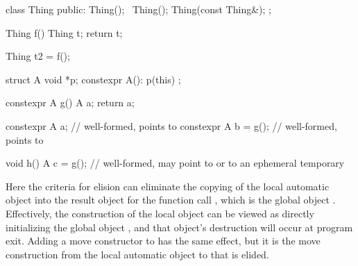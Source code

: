 \pnum
\begin{example}
\begin{codeblock}
class Thing {
public:
  Thing();
  ~Thing();
  Thing(const Thing&);
};

Thing f() {
  Thing t;
  return t;
}

Thing t2 = f();

struct A {
  void *p;
  constexpr A(): p(this) {}
};

constexpr A g() {
  A a;
  return a;
}

constexpr A a;          // well-formed,  points to 
constexpr A b = g();    // well-formed,  points to 

void h() {
  A c = g();            // well-formed,  may point to  or to an ephemeral temporary
}
\end{codeblock}
Here the criteria for elision can
eliminate
the copying of the local automatic object
into the result object for the function call
,
which is the global object
.
Effectively, the construction of the local object
can be viewed as directly initializing the global
object
,
and that object's destruction will occur at program
exit.
Adding a move constructor to  has the same effect, but it is the
move construction from the local automatic object to  that is elided.
\end{example}

